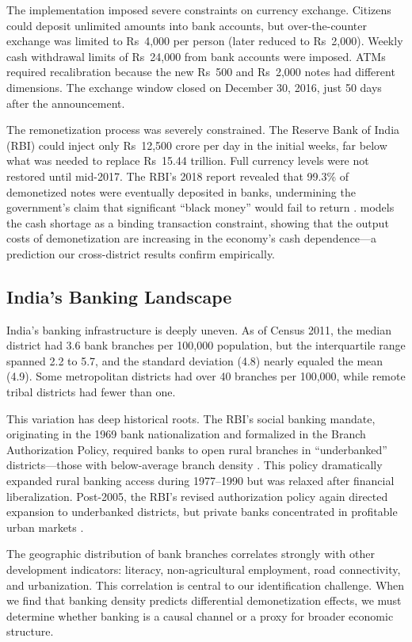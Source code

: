 \documentclass[12pt]{article}
\begin{document}
The implementation imposed severe constraints on currency exchange. Citizens could deposit unlimited amounts into bank accounts, but over-the-counter exchange was limited to Rs~4,000 per person (later reduced to Rs~2,000). Weekly cash withdrawal limits of Rs~24,000 from bank accounts were imposed. ATMs required recalibration because the new Rs~500 and Rs~2,000 notes had different dimensions. The exchange window closed on December 30, 2016, just 50 days after the announcement.

The remonetization process was severely constrained. The Reserve Bank of India (RBI) could inject only Rs~12,500 crore per day in the initial weeks, far below what was needed to replace Rs~15.44 trillion. Full currency levels were not restored until mid-2017. The RBI's 2018 report revealed that 99.3\% of demonetized notes were eventually deposited in banks, undermining the government's claim that significant ``black money'' would fail to return \citep{rbi2018annual}. \citet{lahiri2020demonetization} models the cash shortage as a binding transaction constraint, showing that the output costs of demonetization are increasing in the economy's cash dependence---a prediction our cross-district results confirm empirically.

\subsection{India's Banking Landscape}

India's banking infrastructure is deeply uneven. As of Census 2011, the median district had 3.6 bank branches per 100,000 population, but the interquartile range spanned 2.2 to 5.7, and the standard deviation (4.8) nearly equaled the mean (4.9). Some metropolitan districts had over 40 branches per 100,000, while remote tribal districts had fewer than one.

This variation has deep historical roots. The RBI's social banking mandate, originating in the 1969 bank nationalization and formalized in the Branch Authorization Policy, required banks to open rural branches in ``underbanked'' districts---those with below-average branch density \citep{burgess2005can}. This policy dramatically expanded rural banking access during 1977--1990 but was relaxed after financial liberalization. Post-2005, the RBI's revised authorization policy again directed expansion to underbanked districts, but private banks concentrated in profitable urban markets \citep{karmakar2020access}.

The geographic distribution of bank branches correlates strongly with other development indicators: literacy, non-agricultural employment, road connectivity, and urbanization. This correlation is central to our identification challenge. When we find that banking density predicts differential demonetization effects, we must determine whether banking is a causal channel or a proxy for broader economic structure.
\end{document}
